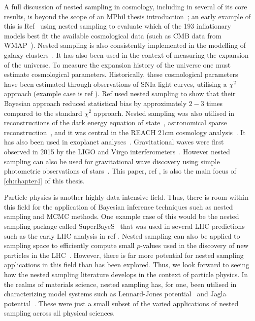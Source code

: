 A full discussion of nested sampling in cosmology, including in several of its core results, is beyond the scope of an MPhil thesis introduction~\cite{Ashton_2022}; an early example of this is Ref~\cite{Martin_2011} using nested sampling to evaluate which of the 193 inflationary models best fit the available cosmological data (such as CMB data from WMAP~\cite{Spergel_2003}).  Nested sampling is also consistently implemented in the modelling of galaxy clusters~\cite{Allen_2002,Allen_2011}. It has also been used in the context of measuring the expansion of the universe. To measure the expansion history of the universe one must estimate cosmological parameters. Historically, these cosmological parameters have been estimated through observations of SNIa light curves, utilising a $\chi^2$ approach (example case is ref \cite{Conley_2010}). Ref \cite{10.1111/j.1365-2966.2011.19584.x} used nested sampling to show that their Bayesian approach reduced statistical bias by approximately $2-3$ times compared to the standard $\chi^2$ approach. Nested sampling was also utilised in reconstructions of the dark energy equation of state~\cite{Zhao_2017,Hee_2016}, astronomical sparse reconstruction~\cite{Higson_2018}, and it was central in the REACH 21cm cosmology analysis~\cite{Anstey_2021}. It has also been used in exoplanet analyses~\cite{Hall_2018,Ahrer_2021}. Gravitational waves were first observed in 2015 by the LIGO and Virgo interferometers~\cite{2015,Acernese_2014}. However nested sampling can also be used for gravitational wave discovery using simple photometric observations of stars~\cite{Mihaylov_2020}. This paper, ref \cite{Mihaylov_2020}, is also the main focus of \cref{ch:chapter4} of this thesis. 


Particle physics is another highly data-intensive field. Thus, there is room within this field for the application of Bayesian inference techniques such as nested sampling and MCMC methods. One example case of this would be the nested sampling package called SuperBayeS~\cite{Feroz_2011,Austri_2006,Trotta_2008} that was used in several LHC predictions such as the early LHC analysis in ref \cite{Trotta_2011}. Nested sampling can also be applied to sampling space to efficiently compute small $p$-values used in the discovery of new particles in the LHC~\cite{Fowlie_2022}. However, there is far more potential for nested sampling applications in this field than has been explored. Thus, we look forward to seeing how the nested sampling literature develops in the context of particle physics. In the realms of materials science, nested sampling has, for one, been utilised in characterizing model systems such as Lennard-Jones potential~\cite{Baldock_2016,wilson_gelb_nielsen_2015} and Jagla potential~\cite{Bart_k_2021}. These were just a small subset of the varied applications of nested sampling across all physical sciences. 

